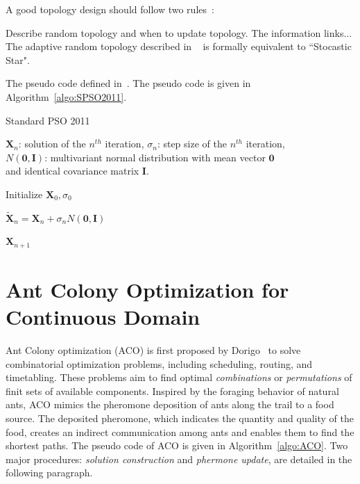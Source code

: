 A good topology design should follow two rules~\cite{Clerc:2007:randomTopology}:

Describe random topology and when to update topology.
The information links...  The adaptive random topology described in ~\cite{Clerc:2007:randomTopology} is formally equivalent to ``Stocastic Star".  


The pseudo code defined in~\cite{Zambrano:2013:SPSO2011}.
The pseudo code is given in Algorithm~\ref{algo:SPSO2011}.



\begin{algorithm}%
\caption{Standard PSO 2011}\label{algo:SPSO2011}

$\boldsymbol{X}_{n}$: solution of the $n^{th}$ iteration, $\sigma_n$: step size of the $n^{th}$ iteration, \\
$N(\boldsymbol{0}, \boldsymbol{I})$: multivariant normal distribution with mean vector $\boldsymbol{0}$ \\ 
and identical covariance matrix $\boldsymbol{I}$.

\BlankLine
{} 

\BlankLine
Initialize $\boldsymbol{X}_0, \sigma_0$ \\
 {

    $\widetilde{\boldsymbol{X}}_n = \boldsymbol{X}_n + \sigma_n N(\boldsymbol{0}, \boldsymbol{I})$  \\

}

\Return $\boldsymbol{X}_{n+1}$

\end{algorithm}




\section{Ant Colony Optimization for Continuous Domain}

Ant Colony optimization (ACO) is first proposed by Dorigo~\cite{Dorigo:1999:ACO} to solve combinatorial optimization problems, including scheduling, routing, and timetabling.
These problems aim to find optimal \textit{combinations} or \textit{permutations} of finit sets of available components.
Inspired by the foraging behavior of natural ants, ACO mimics the pheromone deposition of ants along the trail to a food source.
The deposited pheromone, which indicates the quantity and quality of the food, creates an indirect communication among ants and enables them to find the shortest paths.
The pseudo code of ACO is given in Algorithm~\ref{algo:ACO}.
Two major procedures: \textit{solution construction} and \textit{phermone update}, are detailed in the following paragraph.


